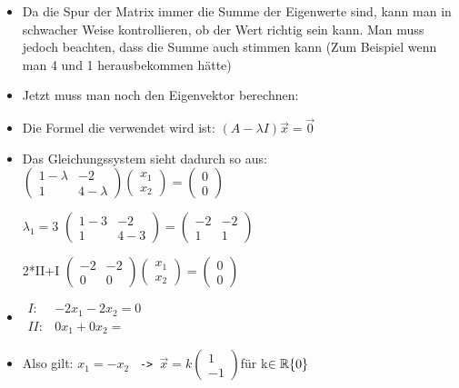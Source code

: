 \documentclass{article}
\newcommand{\R}{\mathbb{R}}
\begin{document}
\begin{itemize}
\begin{itemize}
\begin{itemize}
				\item{Da die Spur der Matrix immer die Summe der Eigenwerte sind, kann man in schwacher Weise kontrollieren, ob der Wert richtig sein kann. Man muss jedoch beachten, dass die Summe auch stimmen kann (Zum Beispiel wenn man 4 und 1 herausbekommen hätte)}
				\item{Jetzt muss man noch den Eigenvektor berechnen:}
				\item{Die Formel die verwendet wird ist: $(A-\lambda I)\vec{x}=\vec{0}$}
				\item{Das Gleichungssystem sieht dadurch so aus: $\begin{pmatrix} 1-\lambda & -2 \\ 1 & 4-\lambda \end{pmatrix}\begin{pmatrix} x_1 \\ x_2 \end{pmatrix}=\begin{pmatrix} 0 \\ 0 \end{pmatrix}$}
				\item[$\lambda_1=3$]{$\begin{pmatrix} 1-3 & -2 \\ 1 & 4-3 \end{pmatrix}=\begin{pmatrix} -2 & -2 \\ 1 & 1 \end{pmatrix}$}
				\item[2*II+I]{$\begin{pmatrix} -2 & -2 \\ 0 & 0 \end{pmatrix}\begin{pmatrix} x_1 \\ x_2 \end{pmatrix}=\begin{pmatrix} 0 \\ 0 \end{pmatrix}$}
				\item{$\begin{matrix} I: & -2x_1-2x_2=0 \\ II: & 0x_1+0x_2= \end{matrix}$}
				\item{Also gilt: $x_1=-x_2$ \texttt{ -> }$\vec{x}=k \begin{pmatrix} 1 \\ -1 \end{pmatrix}$für k$\in\R\\\{0\}$}

\end{itemize}
\end{itemize}
\end{itemize}
\end{document}
